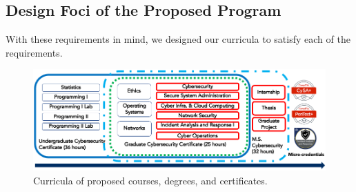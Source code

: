 \documentclass{article}
\begin{document}
\subsection{Design Foci of the Proposed Program}
With these requirements in mind, we designed our curricula to satisfy each of the requirements.



\begin{figure}[th]
\includegraphics[width=\textwidth]{2648_2.png}
\centering
\caption{Curricula of proposed courses, degrees, and certificates.}
\label{fig2}
\end{figure}
\end{document}

